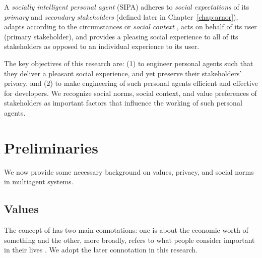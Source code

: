 A \emph{socially intelligent personal agent} (SIPA) adheres to
\emph{social expectations} of its \emph{primary} and \emph{secondary} 
\emph{stakeholders} (defined later in
Chapter~\ref{chap:arnor}), adapts according to the circumstances or
\emph{social context} \citep{Dey-2001-Context}, acts on behalf of its
user (primary stakeholder), and provides a pleasing social
experience to all of its stakeholders as opposed to an individual
experience to its user.


The key objectives of this research are: (1) to engineer personal agents
such that they deliver a pleasant social experience, 
and yet preserve their stakeholders' privacy, and (2) to make
engineering of such personal agents efficient and effective for
developers. We recognize social norms, social context, and value preferences 
of stakeholders as important factors that influence the working of 
such personal agents.



\section{Preliminaries}

We now provide some necessary background on values, privacy, and social norms in
multiagent systems.

\subsection{Values}

The concept of  has two main connotations: one is about the economic worth of something and the other, more broadly, refers to what people consider important in their lives \citep{Friedman-2008-value-sensitive-design}. 
We adopt the later connotation in this research.

